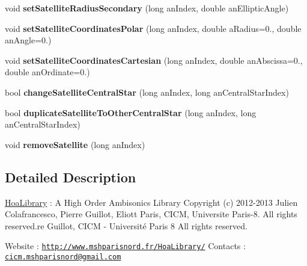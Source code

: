 \begin{DoxyCompactItemize}
\item 
\hypertarget{class_planetary_system_aa2f7ed32aae14ce1fb69e93de431439e}{void {\bfseries set\-Satellite\-Radius\-Secondary} (long an\-Index, double an\-Elliptic\-Angle)}\label{class_planetary_system_aa2f7ed32aae14ce1fb69e93de431439e}

\item 
\hypertarget{class_planetary_system_a2fc534b513016f11bde9fae1aa283957}{void {\bfseries set\-Satellite\-Coordinates\-Polar} (long an\-Index, double a\-Radius=0., double an\-Angle=0.)}\label{class_planetary_system_a2fc534b513016f11bde9fae1aa283957}

\item 
\hypertarget{class_planetary_system_a4f2004bcd09122c7fc91fbb981c09411}{void {\bfseries set\-Satellite\-Coordinates\-Cartesian} (long an\-Index, double an\-Abscissa=0., double an\-Ordinate=0.)}\label{class_planetary_system_a4f2004bcd09122c7fc91fbb981c09411}

\item 
\hypertarget{class_planetary_system_a56360b443eb55848560b510ac17ab0e2}{bool {\bfseries change\-Satellite\-Central\-Star} (long an\-Index, long an\-Central\-Star\-Index)}\label{class_planetary_system_a56360b443eb55848560b510ac17ab0e2}

\item 
\hypertarget{class_planetary_system_a2c830af8903995377007530f71036304}{bool {\bfseries duplicate\-Satellite\-To\-Other\-Central\-Star} (long an\-Index, long an\-Central\-Star\-Index)}\label{class_planetary_system_a2c830af8903995377007530f71036304}

\item 
\hypertarget{class_planetary_system_a7458e3d75f4acb8c1c45787d0bede571}{void {\bfseries remove\-Satellite} (long an\-Index)}\label{class_planetary_system_a7458e3d75f4acb8c1c45787d0bede571}

\end{DoxyCompactItemize}


\subsection{Detailed Description}
\hyperlink{interface_hoa_library}{Hoa\-Library} \-: A High Order Ambisonics Library Copyright (c) 2012-\/2013 Julien Colafrancesco, Pierre Guillot, Eliott Paris, C\-I\-C\-M, Universite Paris-\/8. All rights reserved.\-re Guillot, C\-I\-C\-M -\/ Université Paris 8 All rights reserved.

Website \-: \href{http://www.mshparisnord.fr/HoaLibrary/}{\tt http\-://www.\-mshparisnord.\-fr/\-Hoa\-Library/} Contacts \-: \href{mailto:cicm.mshparisnord@gmail.com}{\tt cicm.\-mshparisnord@gmail.\-com}

